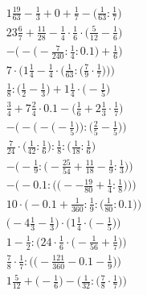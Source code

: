\documentclass[8pt]{article}
\begin{document}
\begin{align}
1\frac{19}{63} - \frac{1}{3} + 0 + \frac{1}{7} - \big(\frac{1}{63} : \frac{1}{7}\big) \\
23\frac{6}{7} + \frac{11}{28} - \frac{1}{4} \cdot \frac{1}{6} \cdot \big(\frac{5}{12} - \frac{1}{6}\big) \\
-\Big(-\big(-\frac{7}{240} : \frac{1}{4} : 0.1\big) + \frac{1}{6}\Big) \\
7 \cdot \bigg(1\frac{1}{4} - \frac{1}{4} \cdot \Big(\frac{1}{63} : \big(\frac{7}{9} \cdot \frac{1}{7}\big)\Big)\bigg) \\
\frac{1}{8} : \big(\frac{1}{2} - \frac{1}{3}\big) + 1\frac{1}{4} \cdot \big(-\frac{1}{5}\big) \\
\frac{3}{4} + 7\frac{2}{4} \cdot 0.1 - \big(\frac{1}{6} + 2\frac{1}{3} \cdot \frac{1}{7}\big) \\
-\bigg(-\Big(-\big(-\frac{1}{5}\big)\Big) : \Big(\frac{2}{5} - \frac{1}{5}\Big)\bigg) \\
\frac{7}{24} \cdot \big(\frac{1}{42} : \frac{1}{6}\big) : \frac{1}{8} : \big(\frac{1}{18} : \frac{1}{6}\big) \\
-\Big(-\frac{1}{9} : \big(-\frac{25}{54} + \frac{11}{18} - \frac{1}{9} : \frac{1}{3}\big)\Big) \\
-\bigg(-0.1 : \Big(\big(--\frac{19}{80} + \frac{1}{4} : \frac{1}{8}\big)\Big)\bigg) \\
10 \cdot \Big(-0.1 + \frac{1}{360} : \frac{1}{9} : \big(\frac{1}{80} : 0.1\big)\Big) \\
\Big(-4\frac{1}{3} - \frac{1}{3}\Big) \cdot \Big(1\frac{1}{4} \cdot \big(-\frac{1}{5}\big)\Big) \\
1 - \frac{1}{2} : \Big(24 \cdot \frac{1}{6} \cdot \big(-\frac{1}{56} + \frac{1}{7}\big)\Big) \\
\frac{7}{8} \cdot \frac{1}{7} : \Big(\big(-\frac{121}{360} - 0.1 - \frac{1}{9}\big)\Big) \\
1\frac{5}{12} + \Big(-\frac{1}{6}\Big) - \Big(\frac{1}{32} : \big(\frac{7}{8} \cdot \frac{1}{7}\big)\Big)
\end{align}
\end{document}
